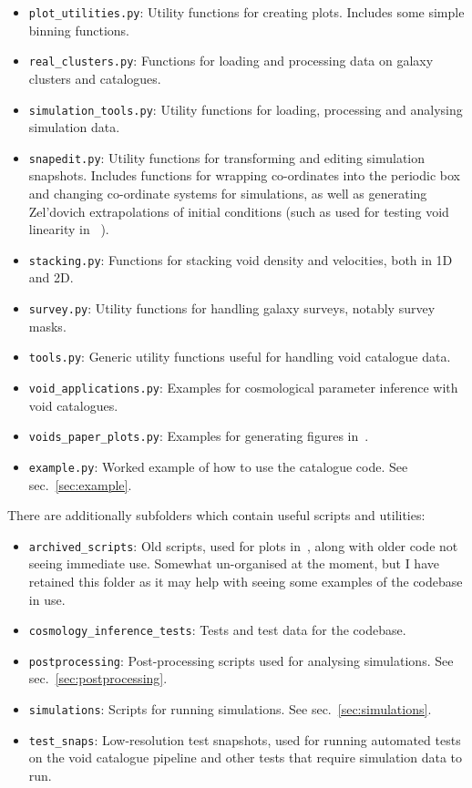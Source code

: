 \documentclass{article}
\newcommand{\codefont}[1]{{\texttt{#1}}}
\begin{document}
\begin{itemize}
		\item \codefont{plot\_utilities.py}: Utility functions for creating plots. Includes some simple binning functions.
		\item \codefont{real\_clusters.py}: Functions for loading and processing data on galaxy clusters and catalogues.
		\item \codefont{simulation\_tools.py}: Utility functions for loading, processing and analysing simulation data.
		\item \codefont{snapedit.py}: Utility functions for transforming and editing simulation snapshots. Includes functions for wrapping co-ordinates into the periodic box and changing co-ordinate systems for simulations, as well as generating Zel'dovich extrapolations of initial conditions (such as used for testing void linearity in ~\citet{stopyra2021build}).
		\item \codefont{stacking.py}: Functions for stacking void density and velocities, both in 1D and 2D.
		\item \codefont{survey.py}: Utility functions for handling galaxy surveys, notably survey masks.
		\item \codefont{tools.py}: Generic utility functions useful for handling void catalogue data.
		\item \codefont{void\_applications.py}: Examples for cosmological parameter inference with void catalogues.
		\item \codefont{voids\_paper\_plots.py}: Examples for generating figures in~\citet{10.1093/mnras/stae1251}.
		\item \codefont{example.py}: Worked example of how to use the catalogue code. See sec.~\ref{sec:example}.
	\end{itemize}
	
	There are additionally subfolders which contain useful scripts and utilities:
	
	\begin{itemize}
		\item \codefont{archived\_scripts}: Old scripts, used for plots in~\citet{stopyra2021build,stopyra2021quantifying,10.1093/mnras/stad3170}, along with older code not seeing immediate use. Somewhat un-organised at the moment, but I have retained this folder as it may help with seeing some examples of the codebase in use.
		\item \codefont{cosmology\_inference\_tests}: Tests and test data for the codebase.
		\item \codefont{postprocessing}: Post-processing scripts used for analysing simulations. See sec.~\ref{sec:postprocessing}.
		\item \codefont{simulations}: Scripts for running simulations. See sec.~\ref{sec:simulations}.
		\item \codefont{test\_snaps}: Low-resolution test snapshots, used for running automated tests on the void catalogue pipeline and other tests that require simulation data to run.
	\end{itemize}
	
\end{document}

